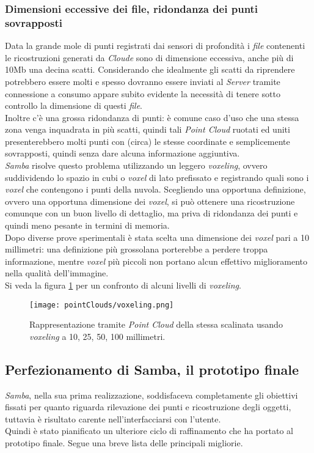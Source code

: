 \subsubsection{Dimensioni eccessive dei file, ridondanza dei punti sovrapposti}
Data la grande mole di punti registrati dai sensori di profondità i \emph{file} contenenti le ricostruzioni generati da \emph{Cloude} sono di dimensione eccessiva, anche più di 10Mb una decina scatti.
Considerando che idealmente gli scatti da riprendere potrebbero essere molti e spesso dovranno essere inviati al \emph{Server} tramite connessione a consumo appare subito evidente la necessità di tenere sotto controllo la dimensione di questi \emph{file}.\\
Inoltre c'è una grossa ridondanza di punti: è comune caso d'uso che una stessa zona venga inquadrata in più scatti, quindi tali \emph{Point Cloud} ruotati ed uniti presenterebbero molti punti con (circa) le stesse coordinate e semplicemente sovrapposti, quindi senza dare alcuna informazione aggiuntiva.\\
\emph{Samba} risolve questo problema utilizzando un leggero \emph{voxeling}, ovvero suddividendo lo spazio in cubi o \emph{voxel} di lato prefissato e registrando quali sono i \emph{voxel} che contengono i punti della nuvola.
Scegliendo una opportuna definizione, ovvero una opportuna dimensione dei \emph{voxel}, si può ottenere una ricostruzione comunque con un buon livello di dettaglio, ma priva di ridondanza dei punti e quindi meno pesante in termini di memoria.\\
Dopo diverse prove sperimentali è stata scelta una dimensione dei \emph{voxel} pari a 10 millimetri: una definizione più grossolana porterebbe a perdere troppa informazione, mentre \emph{voxel} più piccoli non portano alcun effettivo miglioramento nella qualità dell'immagine.\\
Si veda la figura \ref{fig:scalinata-voxeling} per un confronto di alcuni livelli di \emph{voxeling}.
\begin{figure}[!h] 
    \centering 
    \texttt{[image: pointClouds/voxeling.png]} 
    \caption{Rappresentazione tramite \emph{Point Cloud} della stessa scalinata usando \emph{voxeling} a 10, 25, 50, 100 millimetri.}
    \label{fig:scalinata-voxeling}
\end{figure}

\subsection{Perfezionamento di Samba, il prototipo finale}
\emph{Samba}, nella sua prima realizzazione, soddisfaceva completamente gli obiettivi fissati per quanto riguarda rilevazione dei punti e ricostruzione degli oggetti, tuttavia è risultato carente nell'interfacciarsi con l'utente.\\
Quindi è stato pianificato un ulteriore ciclo di raffinamento che ha portato al prototipo finale. Segue una breve lista delle principali migliorie.

